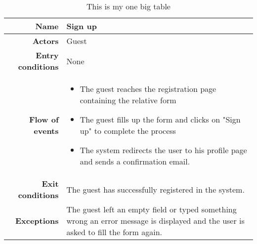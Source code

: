 
\begin{table}[htp]

\begin{tabular}{r|p{7cm}}
\bf\large Name&\bf\large Sign up\\
\hline
\hline
\bf Actors&Guest\\
\hline
\bf Entry conditions&None\\
\hline
\bf Flow of events&
\begin{itemize}
\item The guest reaches the registration page containing the relative form
\item The guest fills up the form and clicks on "Sign up" to complete the process
\item The system redirects the user to his profile page and sends a confirmation email.
\end{itemize}
\\
\hline
\bf Exit conditions&The guest has successfully registered in the system. \\
\hline
\bf Exceptions&The guest left an empty field or typed
 something wrong an error message is displayed 
 and the user is asked to fill the form again.\\
\hline

\end{tabular}
\caption{This is my one big table} \label{tab:signup}
\end{table}
